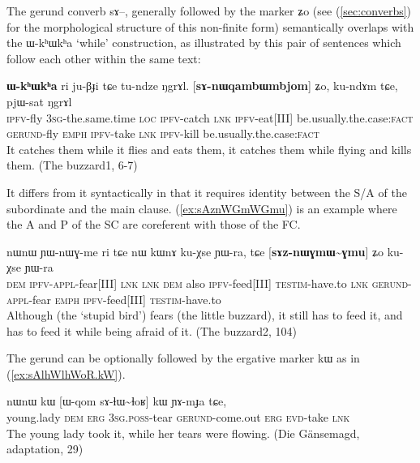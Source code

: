 \documentclass[oldfontcommands,oneside,a4paper,11pt]{article}
\newcommand{\ipa}[1]{{\phon \mbox{#1}}} %
\newcommand{\refb}[1]{(\ref{#1})}
\begin{document}
The gerund converb \ipa{sɤ}--, generally followed by the marker \ipa{ʑo} (see \refb{sec:converbs} for the morphological structure of this non-finite form)   semantically overlaps with the \ipa{ɯ-kʰɯkʰa} `while' construction, as illustrated by this pair of sentences which follow each other within the same text:

\begin{exe}
\ex \label{ex:sanWqambWmbjom}
\gll [\ipa{ɲɯ-nɯqambɯmbjom}]  \textbf{	\ipa{ɯ-kʰɯkʰa}}  	\ipa{ri}  	\ipa{ju-βɟi}  	\ipa{tɕe}  	\ipa{tu-ndze}  	\ipa{ŋgrɤl.}  	[\textbf{\ipa{sɤ-nɯqambɯmbjom}}]  	\ipa{ʑo,}  	\ipa{ku-ndɤm}  	\ipa{tɕe,}  	\ipa{pjɯ-sat}  	\ipa{ŋgrɤl}  \\
\textsc{ipfv}-fly \textsc{3sg}-the.same.time \textsc{loc} \textsc{ipfv}-catch \textsc{lnk} \textsc{ipfv}-eat[III] be.usually.the.case:\textsc{fact} 
\textsc{gerund}-fly \textsc{emph}
\textsc{ipfv}-take \textsc{lnk} \textsc{ipfv}-kill be.usually.the.case:\textsc{fact} 
\\
\glt It catches them while it flies and eats them, it catches them while flying and kills them. (The buzzard1, 6-7)
\end{exe} 

It differs from it syntactically in that it requires identity between the   S/A of the subordinate and the main clause. \refb{ex:sAznWGmWGmu} is an example where the A and P of the SC are coreferent with those of the FC.

\begin{exe}
\ex \label{ex:sAznWGmWGmu}
\gll
 	\ipa{nɯnɯ}  	\ipa{ɲɯ-nɯɣ-me}  	\ipa{ri} \ipa{tɕe} 	\ipa{nɯ}  	\ipa{kɯnɤ}  	\ipa{ku-χse}  	\ipa{ɲɯ-ra,}  	\ipa{tɕe}  	[\textbf{\ipa{sɤz-nɯɣmɯ\textasciitilde{}ɣmu}}]  	\ipa{ʑo}  	\ipa{ku-χse}  	\ipa{ɲɯ-ra}  \\
 	\textsc{dem} \textsc{ipfv-appl}-fear[III] \textsc{lnk}  \textsc{lnk} \textsc{dem} also \textsc{ipfv}-feed[III] \textsc{testim}-have.to \textsc{lnk} \textsc{gerund-appl}-fear \textsc{emph} \textsc{ipfv}-feed[III] \textsc{testim}-have.to \\
 	\glt Although (the `stupid bird') fears (the little buzzard), it still has to feed it, and has to feed it while being afraid of it. (The buzzard2, 104)
\end{exe}

The gerund can be optionally followed by the ergative marker \ipa{kɯ} as in \refb{ex:sAlhWlhWoR.kW}.

\begin{exe}
\ex \label{ex:sAlhWlhWoR.kW}
\gll \ipa{tɤʑi} 	\ipa{nɯnɯ} 	\ipa{kɯ} 	[\ipa{ɯ-qom} 	\ipa{sɤ-ɬɯ\textasciitilde{}ɬoʁ}] 	\ipa{kɯ} 	\ipa{ɲɤ-mɟa} 	\ipa{tɕe,} \\
young.lady \textsc{dem} \textsc{erg} \textsc{3sg.poss}-tear \textsc{gerund}-come.out \textsc{erg} \textsc{evd}-take \textsc{lnk} \\
\glt The young lady took it, while her tears were flowing. (Die Gänsemagd, adaptation, 29)
\end{exe}
\end{document}
